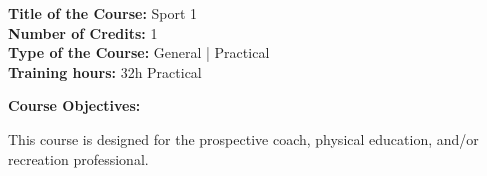 \documentclass[12pt,a4paper]{article}
\begin{document}
\newpage
\nopagebreak
\textbf{Title of the Course:} Sport 1\\
\textbf{Number of Credits:} 1\\
\textbf{Type of the Course:} General | Practical\\
\textbf{Training hours:} 32h Practical\par\vspace{4pt}
\textbf{Course Objectives:}\par\vspace{2pt}
This course is designed for the prospective coach, physical education, and/or recreation
professional.\par\vspace{4pt}
\end{document}
